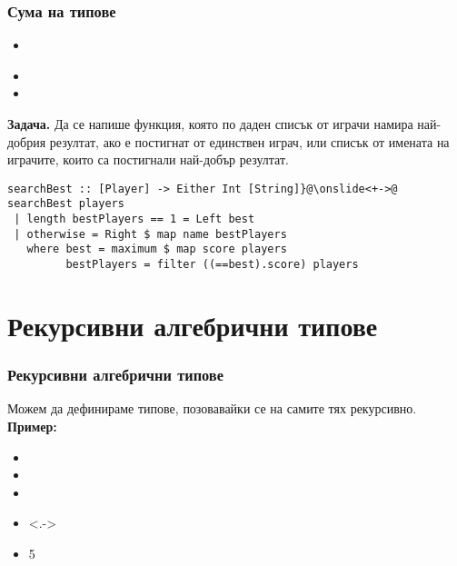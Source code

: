 \documentclass[alsotrans]{beamerswitch}
\begin{document}
\begin{frame}[fragile]
  \frametitle{Сума на типове}
  \begin{itemize}[<+->]
  \item {}\\
      \hspace{10ex}
  \item {}
  \item {}
  \end{itemize}
  \onslide<+->
  \textbf{Задача.} Да се напише функция, която по даден списък от играчи намира най-добрия резултат, ако е постигнат от единствен играч, или списък от имената на играчите, които са постигнали най-добър резултат.
  \onslide<+->
\begin{lstlisting}
searchBest :: [Player] -> Either Int [String]}@\onslide<+->@
searchBest players
 | length bestPlayers == 1 = Left best
 | otherwise = Right $ map name bestPlayers
   where best = maximum $ map score players
         bestPlayers = filter ((==best).score) players
\end{lstlisting}
\end{frame}

\section{Рекурсивни алгебрични типове}

\begin{frame}[fragile]
  \frametitle{Рекурсивни алгебрични типове}
  Можем да дефинираме типове, позовавайки се на самите тях \alert{рекурсивно}.\\[1em]
  \pause
  \textbf{Пример:}
  \begin{itemize}[<+->]
  \item {}
  \item {}
  \item {}
  \item<.-> 
  \item {}5
  \end{itemize}
\end{frame}
\end{document}
